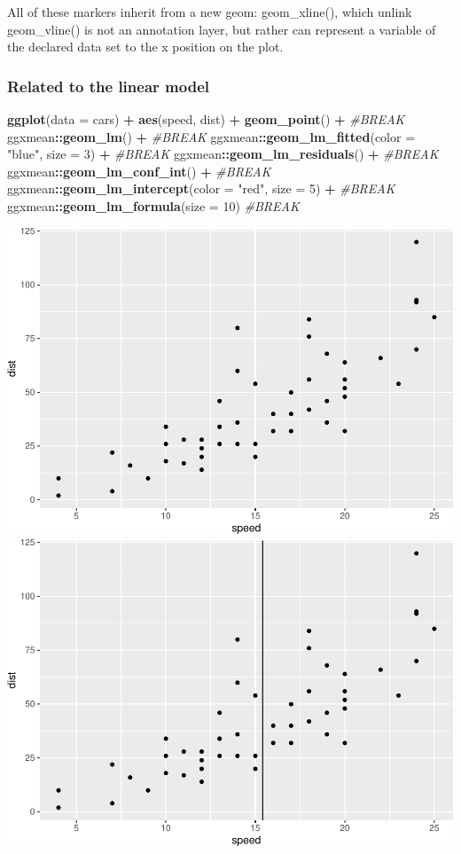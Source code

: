 \documentclass[12pt]{article}
\newenvironment{Shaded}{\begin{snugshade}}{\end{snugshade}}
\newcommand{\CommentTok}[1]{\textcolor[rgb]{0.56,0.35,0.01}{\textit{#1}}}
\newcommand{\DataTypeTok}[1]{\textcolor[rgb]{0.13,0.29,0.53}{#1}}
\newcommand{\DecValTok}[1]{\textcolor[rgb]{0.00,0.00,0.81}{#1}}
\newcommand{\KeywordTok}[1]{\textcolor[rgb]{0.13,0.29,0.53}{\textbf{#1}}}
\newcommand{\NormalTok}[1]{#1}
\newcommand{\OperatorTok}[1]{\textcolor[rgb]{0.81,0.36,0.00}{\textbf{#1}}}
\newcommand{\StringTok}[1]{\textcolor[rgb]{0.31,0.60,0.02}{#1}}
\begin{document}
All of these markers inherit from a new geom: geom\_xline(), which
unlink geom\_vline() is not an annotation layer, but rather can
represent a variable of the declared data set to the x position on the
plot.

\hypertarget{related-to-the-linear-model}{%
\subsubsection{Related to the linear
model}\label{related-to-the-linear-model}}

\begin{Shaded}
\begin{Highlighting}[]
\KeywordTok{ggplot}\NormalTok{(}\DataTypeTok{data =}\NormalTok{ cars) }\OperatorTok{+}\StringTok{ }
\StringTok{  }\KeywordTok{aes}\NormalTok{(speed, dist) }\OperatorTok{+}\StringTok{ }
\StringTok{  }\KeywordTok{geom_point}\NormalTok{() }\OperatorTok{+}\StringTok{ }\CommentTok{#BREAK}
\StringTok{  }\NormalTok{ggxmean}\OperatorTok{::}\KeywordTok{geom_lm}\NormalTok{() }\OperatorTok{+}\StringTok{ }\CommentTok{#BREAK}
\StringTok{  }\NormalTok{ggxmean}\OperatorTok{::}\KeywordTok{geom_lm_fitted}\NormalTok{(}\DataTypeTok{color =} \StringTok{"blue"}\NormalTok{,}
                          \DataTypeTok{size =} \DecValTok{3}\NormalTok{) }\OperatorTok{+}\StringTok{ }\CommentTok{#BREAK}
\StringTok{  }\NormalTok{ggxmean}\OperatorTok{::}\KeywordTok{geom_lm_residuals}\NormalTok{() }\OperatorTok{+}\StringTok{ }\CommentTok{#BREAK}
\StringTok{  }\NormalTok{ggxmean}\OperatorTok{::}\KeywordTok{geom_lm_conf_int}\NormalTok{() }\OperatorTok{+}\StringTok{ }\CommentTok{#BREAK}
\StringTok{  }\NormalTok{ggxmean}\OperatorTok{::}\KeywordTok{geom_lm_intercept}\NormalTok{(}\DataTypeTok{color =} \StringTok{"red"}\NormalTok{,}
                             \DataTypeTok{size =} \DecValTok{5}\NormalTok{) }\OperatorTok{+}\StringTok{ }\CommentTok{#BREAK}
\StringTok{  }\NormalTok{ggxmean}\OperatorTok{::}\KeywordTok{geom_lm_formula}\NormalTok{(}\DataTypeTok{size =} \DecValTok{10}\NormalTok{) }\CommentTok{#BREAK}
\end{Highlighting}
\end{Shaded}

\begin{center}\includegraphics[width=0.3\linewidth]{manuscript_files/figure-latex/unnamed-chunk-7-1} \includegraphics[width=0.3\linewidth]{manuscript_files/figure-latex/unnamed-chunk-7-2} \end{center}
\end{document}
